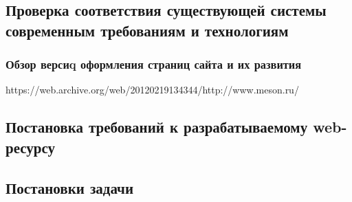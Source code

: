 \subsection{Проверка соответствия существующей системы современным требованиям и технологиям}
    \subsubsection{Обзор версиq оформления страниц сайта и их развития}
        https://web.archive.org/web/20120219134344/http://www.meson.ru/

\subsection{Постановка требований к разрабатываемому web-ресурсу}

\subsection{Постановки задачи}

\clearpage
